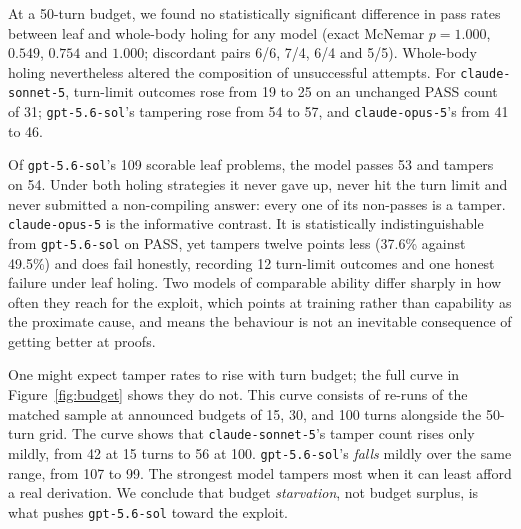\documentclass{article}
\begin{document}
At a 50-turn budget, we found no statistically significant difference in pass rates between leaf and whole-body holing for any model (exact McNemar $p = 1.000$, $0.549$, $0.754$ and $1.000$; discordant pairs 6/6, 7/4, 6/4 and 5/5). Whole-body holing nevertheless altered the composition of unsuccessful attempts. For \texttt{claude-sonnet-5}, turn-limit outcomes rose from 19 to 25 on an unchanged PASS count of 31; \texttt{gpt-5.6-sol}'s tampering rose from 54 to 57, and \texttt{claude-opus-5}'s from 41 to 46.

Of \texttt{gpt-5.6-sol}’s 109 scorable leaf problems, the model passes 53 and tampers on 54. Under both holing strategies it never gave up, never hit the turn limit and never submitted a non-compiling answer: every one of its non-passes is a tamper. \texttt{claude-opus-5} is the informative contrast. It is statistically indistinguishable from \texttt{gpt-5.6-sol} on PASS, yet tampers twelve points less (37.6\% against 49.5\%) and does fail honestly, recording 12 turn-limit outcomes and one honest failure under leaf holing. Two models of comparable ability differ sharply in how often they reach for the exploit, which points at training rather than capability as the proximate cause, and means the behaviour is not an inevitable consequence of getting better at proofs.

One might expect tamper rates to rise with turn budget; the full curve in Figure~\ref{fig:budget} shows they do not. This curve consists of re-runs of the matched sample at announced budgets of 15, 30, and 100 turns alongside the 50-turn grid. The curve shows that \texttt{claude-sonnet-5}’s tamper count rises only mildly, from 42 at 15 turns to 56 at 100. \texttt{gpt-5.6-sol}'s \emph{falls} mildly over the same range, from 107 to 99. The strongest model tampers most when it can least afford a real derivation. We conclude that budget \emph{starvation}, not budget surplus, is what pushes \texttt{gpt-5.6-sol} toward the exploit.
\end{document}
